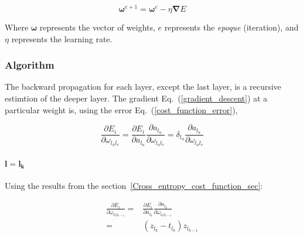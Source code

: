\documentclass[final, paper=letter,5p,times,twocolumn]{elsarticle}
\begin{document}
\begin{equation}
  \bm{\omega}^{e+1} = \bm{\omega}^{e} - \eta \bm{\nabla} E
  \label{gradient_descent}
\end{equation}

Where $\bm{\omega}$ represents the vector of weights, $e$ represents the {\it epoque} (iteration), and $\eta$ represents the learning rate. 


\subsubsection{Algorithm}

The backward propagation for each layer, except the last layer, is a recursive estimtion of the deeper layer. The gradient Eq.~(\ref{gradient_descent}) at a particular weight is, using the error Eq.~(\ref{cost_function_error}),

\begin{equation*}
  \frac{\partial E_{i}}{\partial \omega_{l_{u}l_{v}}} = \frac{\partial E_{i}}{\partial a_{l_{u}}} \frac{\partial a_{l_{u}}}{\partial \omega_{l_{u}l_{v}}} = \delta_{l_{u}}\frac{\partial a_{l_{u}}}{\partial \omega_{l_{u}l_{v}}} 
\end{equation*}


\paragraph{$\bm{l = l_{k}}$}{ Using the results from the section~\ref{Cross_entropy_cost_function_sec}:

  \begin{equation*}
    \begin{split}
      \frac{\partial E_{i}}{\partial \omega_{l_{k}l_{k-1}}} = &  \frac{\partial E_{i}}{\partial a_{l_{k}}} \frac{\partial a_{l_{k}}}{\partial \omega_{l_{k}l_{k-1}}}  \\
              = &  (z_{l_{k}} - t_{l_{k}})z_{l_{k-1}} \\
    \end{split}
  \end{equation*}

}
\end{document}
